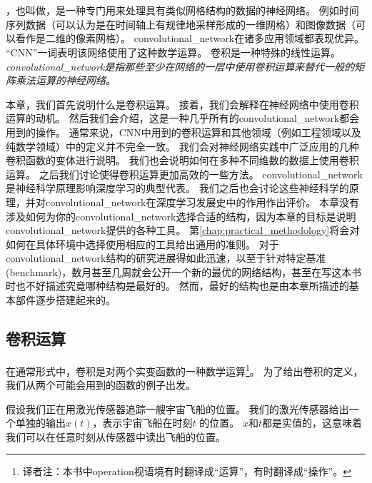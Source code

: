 \chapter{}
\label{chap:convolutional_networks}

\citep{LeCun89a}，也叫做，是一种专门用来处理具有类似网格结构的数据的神经网络。
例如时间序列数据（可以认为是在时间轴上有规律地采样形成的一维网格）和图像数据（可以看作是二维的像素网格）。
\gls{convolutional_network}在诸多应用领域都表现优异。
``\gls{CNN}''一词表明该网络使用了这种数学运算。
卷积是一种特殊的线性运算。
\emph{\gls{convolutional_network}是指那些至少在网络的一层中使用卷积运算来替代一般的矩阵乘法运算的神经网络。}

本章，我们首先说明什么是卷积运算。
接着，我们会解释在神经网络中使用卷积运算的动机。
然后我们会介绍，这是一种几乎所有的\gls{convolutional_network}都会用到的操作。
通常来说，\gls{CNN}中用到的卷积运算和其他领域（例如工程领域以及纯数学领域）中的定义并不完全一致。
我们会对神经网络实践中广泛应用的几种卷积函数的变体进行说明。
我们也会说明如何在多种不同维数的数据上使用卷积运算。
之后我们讨论使得卷积运算更加高效的一些方法。
\gls{convolutional_network}是神经科学原理影响深度学习的典型代表。
我们之后也会讨论这些神经科学的原理，并对\gls{convolutional_network}在深度学习发展史中的作用作出评价。
本章没有涉及如何为你的\gls{convolutional_network}选择合适的结构，因为本章的目标是说明\gls{convolutional_network}提供的各种工具。
第\ref{chap:practical_methodology}将会对如何在具体环境中选择使用相应的工具给出通用的准则。
对于\gls{convolutional_network}结构的研究进展得如此迅速，以至于针对特定基准(benchmark)，数月甚至几周就会公开一个新的最优的网络结构，甚至在写这本书时也不好描述究竟哪种结构是最好的。
然而，最好的结构也是由本章所描述的基本部件逐步搭建起来的。

 
\section{卷积运算}
\label{sec:the_convolution_operation}

在通常形式中，卷积是对两个实变函数的一种数学运算\footnote{译者注：本书中operation视语境有时翻译成``运算''，有时翻译成``操作''。}。
为了给出卷积的定义，我们从两个可能会用到的函数的例子出发。

假设我们正在用激光传感器追踪一艘宇宙飞船的位置。
我们的激光传感器给出一个单独的输出$x(t)$，表示宇宙飞船在时刻$t$ 的位置。
$x$和$t$都是实值的，这意味着我们可以在任意时刻从传感器中读出飞船的位置。


